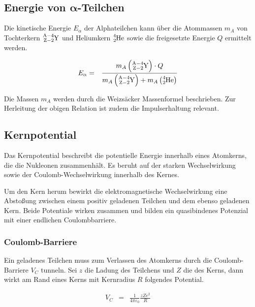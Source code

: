 \documentclass[12pt,a4paper]{scrartcl}
\numberwithin{equation}{section} %
\renewcommand{\[}{} %
\renewcommand{\]}{\noindent} %
\begin{document}
\hypertarget{energie-von-pmbalpha-teilchen}{%
\subsection{\texorpdfstring{Energie von
\(\pmb{\alpha}\)-Teilchen}{Energie von \textbackslash pmb\{\textbackslash alpha\}-Teilchen}}\label{energie-von-pmbalpha-teilchen}}

Die kinetische Energie \(E_\alpha\) der Alphateilchen kann über die
Atommassen \(m_A\) von Tochterkern \(\ce{^{A-4}_{Z-2}Y}\) und Heliumkern
\(\ce{^4_2He}\) sowie die freigesetzte Energie \(Q\) ermittelt werden.

\[
\begin{eqnarray}
        E_\alpha
                &=& \frac{m_{A}\left(\ce{^{A-4}_{Z-2}Y}\right) \cdot Q}
                        {m_{A}\left(\ce{^{A-4}_{Z-2}Y}\right)+m_{A}\left(\ce{^4_2He}\right)}
\end{eqnarray}
\]

Die Massen \(m_A\) werden durch die Weizsäcker Massenformel beschrieben.
Zur Herleitung der obigen Relation ist zudem die Impulserhaltung
relevant.

\hypertarget{kernpotential}{%
\subsection{Kernpotential}\label{kernpotential}}

Das Kernpotential beschreibt die potentielle Energie innerhalb eines
Atomkerns, die die Nukleonen zusammenhält. Es beruht auf der starken
Wechselwirkung sowie der Coulomb-Wechselwirkung innerhalb des Kernes.

Um den Kern herum bewirkt die elektromagnetische Wechselwirkung eine
Abstoßung zwischen einem positiv geladenen Teilchen und dem ebenso
geladenen Kern. Beide Potentiale wirken zusammen und bilden ein
quasibindenes Potenzial mit einer endlichen Coulombbarriere.

\hypertarget{coulomb-barriere}{%
\subsubsection{Coulomb-Barriere}\label{coulomb-barriere}}

Ein geladenes Teilchen muss zum Verlassen des Atomkerns durch die
Coulomb-Barriere \(V_C\) tunneln. Sei \(z\) die Ladung des Teilchens und
\(Z\) die des Kerns, dann wirkt am Rand eines Kerns mit Kernradius \(R\)
folgendes Potential.

\[
\begin{eqnarray}
    V_C &=& \frac{1}{4\pi\varepsilon_0} \frac{zZe^2}{R}
\end{eqnarray}
\]
\end{document}
